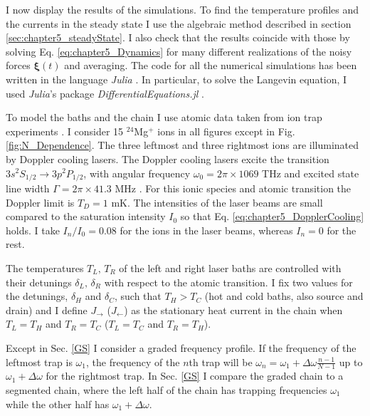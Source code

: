I now display the results of the simulations. To find the temperature profiles and the currents in the steady state I use the algebraic method described in section \ref{sec:chapter5_steadyState}. I also check that the results coincide with those by solving Eq. \eqref{eq:chapter5_Dynamics} for many different realizations of the noisy forces $\bm\xi (t)$ and averaging. The code for all the numerical simulations has been written in the language \textit{Julia} \cite{Bezanson2012,Bezanson2017}. In particular, to solve the Langevin equation, I used \textit{Julia}'s package \textit{DifferentialEquations.jl} \cite{Rackauckas2017}.

To model the baths and the chain I use atomic data taken from ion trap experiments \cite{Leupold2015,Lo2015}. I consider 15 $^{24}$Mg$^+$ ions in all figures except in Fig. \ref{fig:N_Dependence}. The three leftmost and three rightmost ions are illuminated by Doppler cooling lasers. The Doppler cooling lasers excite the transition $3s^2S_{1/2}\rightarrow 3p^2P_{1/2}$, with angular frequency $\omega_0 = 2 \pi \times 1069$ THz and excited state line width $\Gamma = 2\pi \times 41.3$ MHz \cite{Ruiz2014}. For this ionic species and atomic transition the Doppler limit is $T_D = 1$ mK.
The intensities of the laser beams are small compared to the saturation intensity $I_0$ so that Eq. \eqref{eq:chapter5_DopplerCooling} holds. I take $I_n/I_0 = 0.08$ for the ions  in the laser beams, whereas  $I_n=0$ for the rest.

The temperatures $T_L,\,T_R$ of the left and right laser baths are controlled with their detunings $\delta_L,\,\delta_R$ with respect to the atomic transition. I fix two values for the detunings, $\delta_H$ and $\delta_C$, such that $T_H>T_C$ (hot and cold baths, also source and drain) and I define $J_\rightarrow$ ($J_\leftarrow$) as the stationary heat current in the chain when $T_L = T_H$ and $T_R = T_C$ ($T_L = T_C$ and $T_R = T_H$).

Except in Sec. \ref{GS} I consider a graded frequency profile.
If the frequency of the leftmost trap is $\omega_1$, the frequency of the $n$th trap will be $\omega_n = \omega_1 +\Delta\omega\frac{n-1}{N-1}$ up to $\omega_1 +\Delta\omega$ for the rightmost trap. In
Sec. \ref{GS} I compare the graded chain to a segmented chain, where the left half of the chain has trapping frequencies $\omega_1$ while the other half has $\omega_1 +\Delta\omega$.


